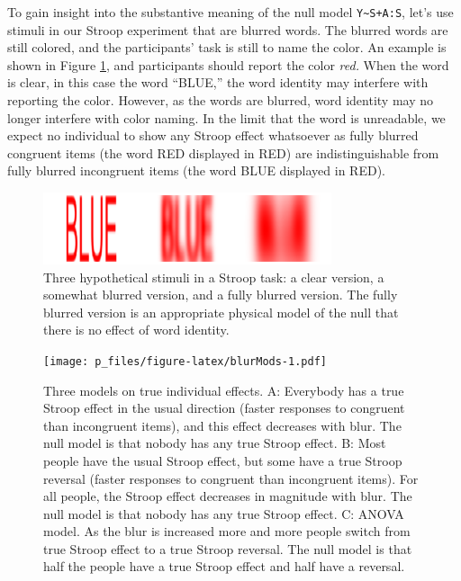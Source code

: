 \documentclass[
  english,
  ,man]{apa6}
\begin{document}
To gain insight into the substantive meaning of the null model \texttt{Y\textasciitilde{}S+A:S}, let's use stimuli in our Stroop experiment that are blurred words. The blurred words are still colored, and the participants' task is still to name the color. An example is shown in Figure \ref{fig:blur}, and participants should report the color \emph{red.} When the word is clear, in this case the word ``BLUE,'' the word identity may interfere with reporting the color. However, as the words are blurred, word identity may no longer interfere with color naming. In the limit that the word is unreadable, we expect no individual to show any Stroop effect whatsoever as fully blurred congruent items (the word RED displayed in RED) are indistinguishable from fully blurred incongruent items (the word BLUE displayed in RED).

\begin{figure}
\includegraphics[width=3.33in]{blur} \caption{Three hypothetical stimuli in a Stroop task: a clear version, a somewhat blurred version, and a fully blurred version.  The fully blurred version is an appropriate physical model of the null that there is no effect of word identity.}\label{fig:blur}
\end{figure}

\begin{figure}
\centering
\texttt{[image: p\_files/figure-latex/blurMods-1.pdf]}
\caption{\label{fig:blurMods}Three models on true individual effects. A: Everybody has a true Stroop effect in the usual direction (faster responses to congruent than incongruent items), and this effect decreases with blur. The null model is that nobody has any true Stroop effect. B: Most people have the usual Stroop effect, but some have a true Stroop reversal (faster responses to congruent than incongruent items). For all people, the Stroop effect decreases in magnitude with blur. The null model is that nobody has any true Stroop effect. C: ANOVA model. As the blur is increased more and more people switch from true Stroop effect to a true Stroop reversal. The null model is that half the people have a true Stroop effect and half have a reversal.}
\end{figure}
\end{document}
